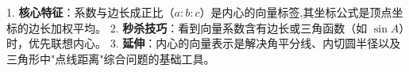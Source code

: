 \begin{summarybox}
1. \textbf{核心特征}：系数与边长成正比（$a:b:c$）是内心的向量标签,其坐标公式是顶点坐标的边长加权平均。
2. \textbf{秒杀技巧}：看到向量系数含有边长或三角函数（如 $\sin A$）时，优先联想内心。
3. \textbf{延伸}：内心的向量表示是解决角平分线、内切圆半径以及三角形中"点线距离"综合问题的基础工具。
\end{summarybox}